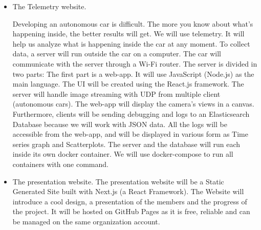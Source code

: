 \documentclass[12pt]{article}
\begin{document}
\begin{itemize}
\item The Telemetry website.

Developing an autonomous car is difficult. The more you know about what’s happening inside, the better results will get. We will use telemetry. It will help us analyze what is happening inside the car at any moment. To collect data, a server will run outside the car on a computer. The car will communicate with the server through a Wi-Fi router. The server is divided in two parts: The first part is a web-app. It will use JavaScript (Node.js) as the main language. The UI will be created using the React.js framework. The server will handle image streaming with UDP from multiple client (autonomous cars). The web-app will display the camera’s views in a canvas. Furthermore, clients will be sending debugging and logs to an Elasticsearch Database because we will work with JSON data. All the logs will be accessible from the web-app, and will be displayed in various form as Time series graph and Scatterplots. The server and the database will run each inside its own docker container. We will use docker-compose to run all containers with one command.

\item The presentation website. The presentation website will be a Static Generated Site built with Next.js (a React Framework). The Website will introduce a cool design, a presentation of the members and the progress of the project. It will be hosted on GitHub Pages as it is free, reliable and can be managed on the same organization account.
\end{itemize}

\newpage
\end{document}
